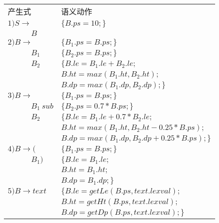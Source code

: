 \documentclass[UTF8,noindent]{ctexart}
\begin{document}
\begin{center}
  \begin{tabular}{|ll|}
	\hline
	产生式 & 语义动作\\
  $1)S\rightarrow $ & $\{B.ps = 10;\}$\\
  $\qquad \quad B$ &\\
$2)B\rightarrow $ & $\{B_1.ps = B.ps;\}$\\
$\qquad\quad B_1$& $\{B_2.ps = B.ps;\}$\\
$\qquad\quad B_2$ &$ \{B.le = B_1.le + B_2.le;$\\
& $B.ht = max(B_1.ht, B_2.ht);$\\
& $B.dp = max(B_1.dp, B_2.dp);\}$\\
$3)B\rightarrow $ & $\{B_1.ps = B.ps;\}$\\
$\qquad\quad B_1\ sub$& $\{B_2.ps = 0.7*B.ps;\}$\\
$\qquad\quad B_2$& $\{B.le = B_1.le + 0.7 * B_2.le;$\\
& $B.ht = max(B_1.ht, B_2.ht - 0.25* B.ps);$\\
& $B.dp = max(B_1.dp, B_2.dp + 0.25* B.ps);\}$\\
$4)B\rightarrow ($ & $\{B_1.ps = B.ps;\}$\\
$\qquad \quad B_1)$& $\{B.le = B_1.le;$\\
& $B.ht = B_1.ht;$\\
& $B.dp = B_1.dp;\}$\\
$5)B\rightarrow text $ & $\{B.le = getLe(B.ps, text.lexval);$\\
& $B.ht = getHt(B.ps, text.lexval);$\\
& $B.dp = getDp(B.ps, text.lexval);\}$\\
\hline
  \end{tabular}
  \end{center}
\end{document}

